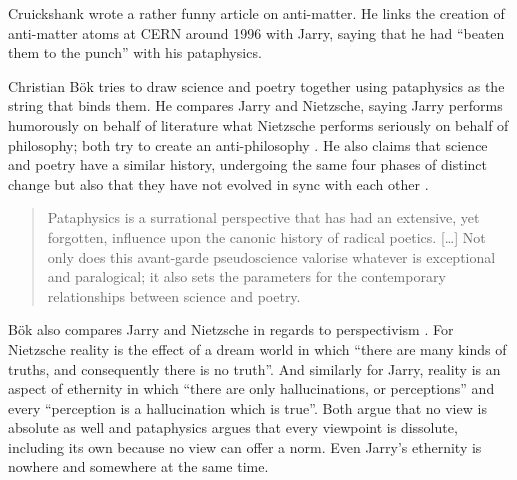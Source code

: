 Cruickshank \citeyear{Cruickshank} wrote a rather funny article on anti-matter. He links the creation of anti-matter atoms at CERN around 1996 with Jarry, saying that he had ``beaten them to the punch'' with his pataphysics.

Christian Bök \citeyear{Bok2002} tries to draw science and poetry together using pataphysics as the string that binds them. He compares Jarry and Nietzsche, saying Jarry performs humorously on behalf of literature what Nietzsche performs seriously on behalf of philosophy; both try to create an anti-philosophy \autocite[p.9]{Bok2002}. He also claims that science and poetry have a similar history, undergoing the same four phases of distinct change but also that they have not evolved in sync with each other \autocite[p.15]{Bok2002}.


\begin{quotation}
  Pataphysics is a surrational perspective that has had an extensive, yet forgotten, influence upon the canonic history of radical poetics. […] Not only does this avant-garde pseudoscience valorise whatever is exceptional and paralogical; it also sets the parameters for the contemporary relationships between science and poetry. 
\end{quotation}

Bök also compares Jarry and Nietzsche in regards to perspectivism \citeyear[p.31]{Bok2002}. For Nietzsche reality is the effect of a dream world in which ``there are many kinds of truths, and consequently there is no truth''. And similarly for Jarry, reality is an aspect of ethernity in which ``there are only hallucinations, or perceptions'' and every ``perception is a hallucination which is true''. Both argue that no view is absolute as well and pataphysics argues that every viewpoint is dissolute, including its own because no view can offer a norm. Even Jarry's ethernity is nowhere and somewhere at the same time.

